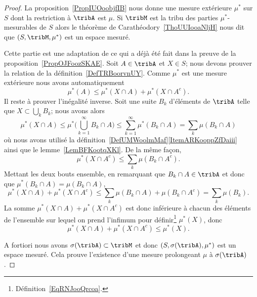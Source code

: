 \begin{proof}
	La proposition~\ref{PropIUOoobjfIB} nous donne une mesure extérieure \( \mu^*\) sur \( S\) dont la restriction à \( \tribA\) est \( \mu\). Si \( \tribM\) est la tribu des parties \( \mu^*\)-mesurables de \( S\) alors le théorème de Carathéodory~\ref{ThoUUIooaNljH} nous dit que \( (S,\tribM,\mu^*)\) est un espace mesuré.
	\begin{subproof}
		\spitem[\( \tribA\subset\tribM\)]
		Cette partie est une adaptation de ce qui a déjà été fait dans la preuve de la proposition~\ref{PropOJFoozSKAE}. Soit \( A\in\tribA\) et \( X\in S\); nous devons prouver la relation de la définition~\ref{DefTRBoorvnUY}. Comme \( \mu^*\) est une mesure extérieure nous avons automatiquement
		\begin{equation}
			\mu^*(A)\leq \mu^*(X\cap A)+\mu^*(X\cap A^c).
		\end{equation}
		Il reste à prouver l'inégalité inverse. Soit une suite \( B_k\) d'éléments de \( \tribA\) telle que \( X\subset\bigcup_kB_k\); nous avons alors
		\begin{equation}
			\mu^*(X\cap A)\leq \mu^*\big( \bigcup_{k=1}^{\infty}B_k\cap A \big)\leq \sum_{k=1}^{\infty}\mu^*(B_k\cap A)=\sum_k\mu(B_k\cap A)
		\end{equation}
		où nous avons utilisé la définition~\ref{DefUMWoolmMaf}\ref{ItemARKooppZfDaiii} ainsi que le lemme~\ref{LemBFKootqXKl}. De la même façon,
		\begin{equation}
			\mu^*(X\cap A^c)\leq \sum_k\mu(B_k\cap A^c).
		\end{equation}
		Mettant les deux bouts ensemble, en remarquant que \( B_k\cap A\in\tribA\) et donc que \( \mu^*(B_k\cap A)=\mu(B_k\cap A)\),
		\begin{equation}
			\mu^*(X\cap A)+\mu^*(X\cap A^c)\leq \sum_k\mu(B_k\cap A)+\mu(B_k\cap A^c)=\sum_k\mu(B_k).
		\end{equation}
		La somme \( \mu^*(X\cap A)+\mu^*(X\cap A^c)\) est donc inférieure à chacun des éléments de l'ensemble sur lequel on prend l'infimum pour définir\footnote{Définition~\ref{EqRNJooQrcoa}.} \( \mu^*(X)\), donc
		\begin{equation}
			\mu^*(X\cap A)+\mu^*(X\cap A^c)\leq \mu^*(X).
		\end{equation}
	\end{subproof}

	A fortiori nous avons \( \sigma(\tribA)\subset\tribM\) et donc \( (S,\sigma(\tribA),\mu^*)\) est un espace mesuré. Cela prouve l'existence d'une mesure prolongeant \( \mu\) à \( \sigma(\tribA)\).


\end{proof}
